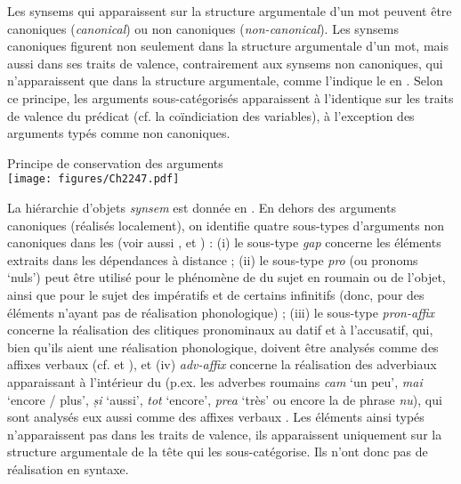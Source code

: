 Les synsems qui apparaissent sur la structure argumentale d’un mot peuvent être canoniques (\textit{canonical}) ou non canoniques (\textit{non-canonical}). Les synsems canoniques figurent non seulement dans la structure argumentale d’un mot, mais aussi dans ses traits de valence, contrairement aux synsems non canoniques, qui n’apparaissent que dans la structure argumentale, comme l’indique le  en . Selon ce principe, les arguments sous-catégorisés apparaissent à l’identique sur les traits de valence du prédicat (cf. la coïndiciation des variables), à l’exception des arguments typés comme non canoniques. 


\ea \label{ch2:ex247}
Principe de conservation des arguments\\
\texttt{[image: figures/Ch2247.pdf]}
\z

La hiérarchie d’objets \textit{synsem} est donnée en . En dehors des arguments canoniques (réalisés localement), on identifie quatre sous-types d’arguments non canoniques dans les  (voir aussi \citealt{MillerEtAl1997}, \citealt{Monachesi1999} et \citealt{GinzburgEtAl2000}) : (i) le sous-type \textit{gap} concerne les éléments extraits dans les dépendances à distance ; (ii) le sous-type \textit{pro} (ou pronoms ‘nuls’) peut être utilisé pour le phénomène de  du sujet en roumain ou  de l’objet, ainsi que pour le sujet des impératifs et de certains infinitifs (donc, pour des éléments n’ayant pas de réalisation phonologique) ; (iii) le sous-type \textit{pron-affix} concerne la réalisation des clitiques pronominaux au datif et à l’accusatif, qui, bien qu’ils aient une réalisation phonologique, doivent être analysés comme des affixes verbaux (cf. \citealt{MillerEtAl1997} et \citealt{Monachesi1999}), et (iv) \textit{adv-affix} concerne la réalisation des adverbiaux apparaissant à l’intérieur du  (p.ex. les adverbes roumains \textit{cam} ‘un peu’, \textit{mai} ‘encore / plus’, \textit{și} ‘aussi’, \textit{tot} ‘encore’, \textit{prea} ‘très’ ou encore la  de phrase \textit{nu}), qui sont analysés eux aussi comme des affixes verbaux \citep{Barbu1999,Barbu2003,Monachesi2000}. Les éléments ainsi typés n’apparaissent pas dans les traits de valence, ils apparaissent uniquement sur la structure argumentale de la tête qui les sous-catégorise. Ils n’ont donc pas de réalisation en syntaxe. 

